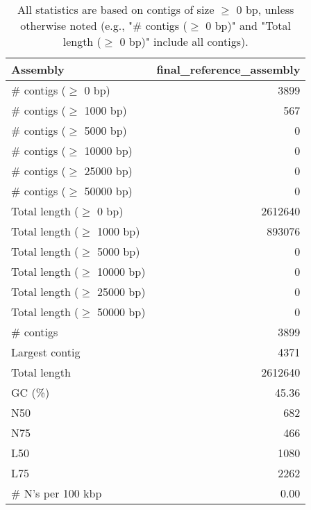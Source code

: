 \documentclass[12pt,a4paper]{article}
\begin{document}
\begin{table}[ht]
\begin{center}
\caption{All statistics are based on contigs of size $\geq$ 0 bp, unless otherwise noted (e.g., "\# contigs ($\geq$ 0 bp)" and "Total length ($\geq$ 0 bp)" include all contigs).}
\begin{tabular}{|l*{1}{|r}|}
\hline
Assembly & final\_reference\_assembly \\ \hline
\# contigs ($\geq$ 0 bp) & 3899 \\ \hline
\# contigs ($\geq$ 1000 bp) & 567 \\ \hline
\# contigs ($\geq$ 5000 bp) & 0 \\ \hline
\# contigs ($\geq$ 10000 bp) & 0 \\ \hline
\# contigs ($\geq$ 25000 bp) & 0 \\ \hline
\# contigs ($\geq$ 50000 bp) & 0 \\ \hline
Total length ($\geq$ 0 bp) & 2612640 \\ \hline
Total length ($\geq$ 1000 bp) & 893076 \\ \hline
Total length ($\geq$ 5000 bp) & 0 \\ \hline
Total length ($\geq$ 10000 bp) & 0 \\ \hline
Total length ($\geq$ 25000 bp) & 0 \\ \hline
Total length ($\geq$ 50000 bp) & 0 \\ \hline
\# contigs & 3899 \\ \hline
Largest contig & 4371 \\ \hline
Total length & 2612640 \\ \hline
GC (\%) & 45.36 \\ \hline
N50 & 682 \\ \hline
N75 & 466 \\ \hline
L50 & 1080 \\ \hline
L75 & 2262 \\ \hline
\# N's per 100 kbp & 0.00 \\ \hline
\end{tabular}
\end{center}
\end{table}
\end{document}
